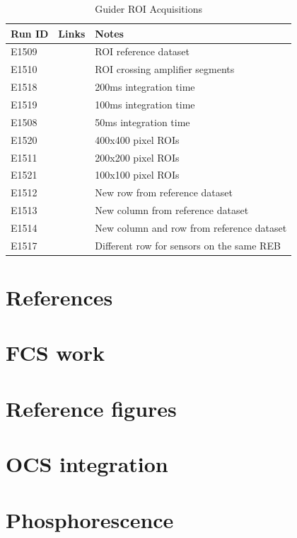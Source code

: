 \begin{table}[H]\label{table:runs_guider}
\centering
\caption{Guider ROI Acquisitions}
\begin{tabular}{|p{1.5cm}|p{2.9cm}|p{9cm}|}
\hline
Run ID & Links & Notes \\ \hline
E1509 & & ROI reference dataset\\ \hline
E1510 & & ROI crossing amplifier segments\\ \hline
E1518 & & 200ms integration time\\ \hline
E1519 & & 100ms integration time\\ \hline
E1508 & & 50ms integration time\\ \hline
E1520 & & 400x400 pixel ROIs\\ \hline
E1511 & & 200x200 pixel ROIs\\ \hline
E1521 & & 100x100 pixel ROIs\\ \hline
E1512 & & New row from reference dataset\\ \hline
E1513 & & New column from reference dataset\\ \hline
E1514 & & New column and row from reference dataset\\ \hline
E1517 & & Different row for sensors on the same REB\\ \hline
\end{tabular}
\end{table}



\section{References}


\appendix

\section{FCS work}

\section{Reference figures}


\section{OCS integration}

\section{Phosphorescence}\label{appendix:phosphorescence}




